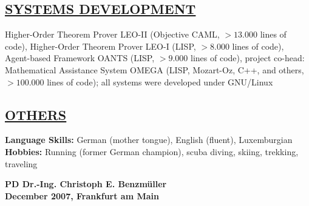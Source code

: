 \documentclass[10pt]{article}
\begin{document}
\subsection*{\underline{SYSTEMS DEVELOPMENT}}
Higher-Order Theorem Prover LEO-II (Objective CAML, $> 13.000$ lines
of code), Higher-Order Theorem Prover LEO-I (LISP, $> 8.000$ lines of
code), Agent-based Framework OANTS (LISP, $> 9.000$ lines of code),
project co-head: Mathematical Assistance System OMEGA (LISP,
Mozart-Oz, C++, and others, $>100.000$ lines of code); all systems were
developed under GNU/Linux

\subsection*{\underline{OTHERS}}
\noindent
\textbf{Language Skills:} German (mother tongue), English (fluent), Luxemburgian\\
\noindent
\textbf{Hobbies:} Running (former German champion), scuba diving, skiing, trekking, traveling

\vspace*{1cm}

\begin{flushright}{\bf PD Dr.-Ing. Christoph E. Benzm\"uller\\ December 2007, Frankfurt am Main}
\end{flushright}
\end{document}
